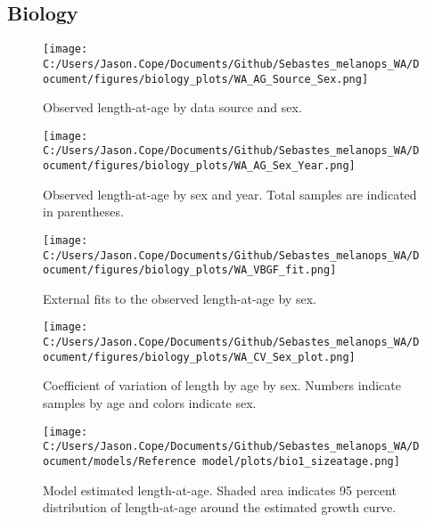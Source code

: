 \documentclass[11pt,
  letterpaper,
]{article}
\begin{document}
\pagebreak

\hypertarget{biology}{%
\subsection{Biology}\label{biology}}

\begin{figure}
{\centering
\texttt{[image: C:/Users/Jason.Cope/Documents/Github/Sebastes\_melanops\_WA/Document/figures/biology\_plots/WA\_AG\_Source\_Sex.png]}
}
\caption{Observed length-at-age by data source and sex.\label{fig:len-age-data-sex}}
\end{figure}

\pagebreak

\begin{figure}
{\centering
\texttt{[image: C:/Users/Jason.Cope/Documents/Github/Sebastes\_melanops\_WA/Document/figures/biology\_plots/WA\_AG\_Sex\_Year.png]}
}
\caption{Observed length-at-age by sex and year. Total samples are indicated in parentheses.\label{fig:len-age-sex-year}}
\end{figure}

\pagebreak

\begin{figure}
{\centering
\texttt{[image: C:/Users/Jason.Cope/Documents/Github/Sebastes\_melanops\_WA/Document/figures/biology\_plots/WA\_VBGF\_fit.png]}
}
\caption{External fits to the observed length-at-age by sex.\label{fig:len-age-fit}}
\end{figure}

\pagebreak

\begin{figure}
{\centering
\texttt{[image: C:/Users/Jason.Cope/Documents/Github/Sebastes\_melanops\_WA/Document/figures/biology\_plots/WA\_CV\_Sex\_plot.png]}
}
\caption{Coefficient of variation of length by age by sex. Numbers indicate samples by age and colors indicate sex.\label{fig:cv-lt-age}}
\end{figure}

\pagebreak

\begin{figure}
{\centering
\texttt{[image: C:/Users/Jason.Cope/Documents/Github/Sebastes\_melanops\_WA/Document/models/Reference model/plots/bio1\_sizeatage.png]}
}
\caption{Model estimated length-at-age. Shaded area indicates 95 percent distribution of length-at-age around the estimated growth curve.\label{fig:len-age-ss}}
\end{figure}
\end{document}

